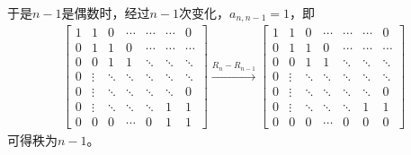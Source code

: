 \documentclass{article}
\begin{document}
于是$n - 1$是偶数时，经过$n - 1$次变化，$a_{n, n - 1} = 1$，即
\begin{align*}
  \begin{bmatrix}
    1 & 1      & 0      & \cdots & \cdots & \cdots & 0      \\
    0 & 1      & 1      & 0      & \cdots & \cdots & \cdots \\
    0 & 0      & 1      & 1      & \ddots & \ddots & \ddots \\
    0 & \vdots & \ddots & \ddots & \ddots & \ddots & \ddots \\
    0 & \vdots & \ddots & \ddots & \ddots & \ddots & 0      \\
    0 & \vdots & \ddots & \ddots & \ddots & 1      & 1      \\
    0 & 0      & 0      & \cdots & 0      & 1      & 1
  \end{bmatrix}
  \xrightarrow{R_n - R_{n - 1}}
  \begin{bmatrix}
    1 & 1      & 0      & \cdots & \cdots & \cdots & 0      \\
    0 & 1      & 1      & 0      & \cdots & \cdots & \cdots \\
    0 & 0      & 1      & 1      & \ddots & \ddots & \ddots \\
    0 & \vdots & \ddots & \ddots & \ddots & \ddots & \ddots \\
    0 & \vdots & \ddots & \ddots & \ddots & \ddots & 0      \\
    0 & \vdots & \ddots & \ddots & \ddots & 1      & 1      \\
    0 & 0      & 0      & \cdots & 0      & 0      & 0
  \end{bmatrix}
\end{align*}
可得秩为$n - 1$。
\end{document}
